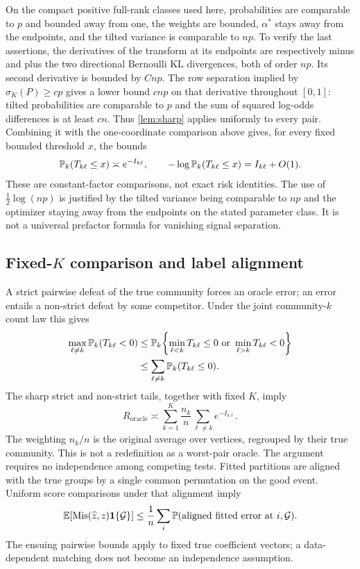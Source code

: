 On the compact positive full-rank classes used here, probabilities are
comparable to $p$ and bounded away from one, the weights are bounded,
$\alpha^*$ stays away from the endpoints, and the tilted variance is comparable
to ${np}$. To verify the last assertions, the derivatives of the transform
at its endpoints are respectively minus and plus the two directional
Bernoulli KL divergences, both of order ${np}$. Its second derivative is
bounded by $C{np}$. The row separation implied by
$\sigma_K(P)\ge c p$ gives a lower bound $c{np}$ on that derivative
throughout $[0,1]$: tilted probabilities are comparable to $p$ and the
sum of squared log-odds differences is at least $cn$.
Thus \cref{lem:sharp} applies uniformly to every pair. Combining it
with the one-coordinate comparison above gives, for every fixed
bounded threshold $x$, the bounds
\[
 \mathbb P_k(T_{k\ell}\le x)\asymp e^{-I_{k\ell}},
 \qquad -\log\mathbb P_k(T_{k\ell}\le x)=I_{k\ell}+O(1).
\]
These are constant-factor comparisons, not exact risk identities.
The use of $\tfrac12\log(np)$ is justified by the tilted variance
being comparable to $np$ and the optimizer staying away from the
endpoints on the stated parameter class. It is not a universal
prefactor formula for vanishing signal separation.

\subsection{Fixed-\texorpdfstring{$K$}{K} comparison and label alignment}

A strict pairwise defeat of the true community forces an oracle
error; an error entails a non-strict defeat by some competitor.
Under the joint community-$k$ count law this gives
\[
 \begin{split}
 \max_{\ell\ne k}\mathbb P_k(T_{k\ell}<0)
 &\le\mathbb P_k\!\left\{
       \min_{\ell<k}T_{k\ell}\le0
       \ \text{or}\ \min_{\ell>k}T_{k\ell}<0\right\}\\
 &\le\sum_{\ell\ne k}\mathbb P_k(T_{k\ell}\le0).
 \end{split}
\]
The sharp strict and non-strict tails, together with fixed $K$, imply
\begin{equation}\label{eq:oracle-pairs}
 R_{\mathrm{oracle}}
 \asymp\sum_{k=1}^K\frac{n_k}{n}
                    \sum_{\ell\ne k}e^{-I_{k\ell}}.
\end{equation}
The weighting $n_k/n$ is the original average over vertices, regrouped
by their true community. This is not a redefinition as a worst-pair
oracle. The argument requires no independence among competing tests.
Fitted partitions are aligned with the true groups by a single common
permutation on the good event. Uniform score comparisons under that
alignment imply
\[
 \mathbb E[\operatorname{Mis}(\widehat z,z)\mathbf1\{\mathcal G\}]
 \le\frac1n\sum_i\mathbb P(\text{aligned fitted error at }i,\mathcal G).
\]
The ensuing pairwise bounds apply to fixed true coefficient vectors; a
data-dependent matching does not become an independence assumption.

